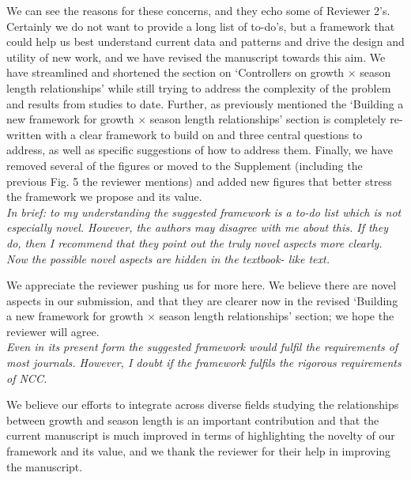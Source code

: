 \documentclass[11pt]{article}
\begin{document}
We can see the reasons for these concerns, and they echo some of Reviewer 2's. Certainly we do not want to provide a long list of to-do's, but a framework that could help us best understand current data and patterns and drive the design and utility of new work, and we have revised the manuscript towards this aim. We have streamlined and shortened the section on `Controllers on growth $\times$ season length relationships' while still trying to address the complexity of the problem and results from studies to date. Further, as previously mentioned the  `Building a new framework for growth $\times$ season length relationships' section is completely re-written with a clear framework to build on and three central questions to address, as well as specific suggestions of how to address them. Finally, we have removed several of the figures or moved to the Supplement (including the previous Fig. 5 the reviewer mentions) and added new figures that better stress the framework we propose and its value. \\

\emph{In brief: to my understanding the suggested framework is a to-do list which is not especially novel. However, the authors may disagree with me about this. If they do, then I recommend that they point out the truly novel aspects more clearly. Now the possible novel aspects are hidden in the textbook- like text.}

We appreciate the reviewer pushing us for more here. We believe there are novel aspects in our submission, and that they are clearer now in the revised `Building a new framework for growth $\times$ season length relationships' section; we hope the reviewer will agree. \\

\emph{Even in its present form the suggested framework would fulfil the requirements of most journals. However, I doubt if the framework fulfils the rigorous requirements of NCC.}

We believe our efforts to integrate across diverse fields studying the relationships between growth and season length is an important contribution and that the current manuscript is much improved in terms of highlighting the novelty of our framework and its value, and we thank the reviewer for their help in improving the manuscript.\\
\end{document}
